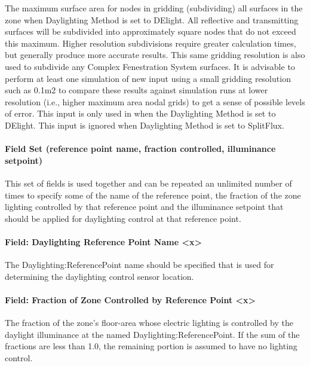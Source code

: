 The maximum surface area for nodes in gridding (subdividing) all surfaces in the zone when Daylighting Method is set to DElight. All reflective and transmitting surfaces will be subdivided into approximately square nodes that do not exceed this maximum. Higher resolution subdivisions require greater calculation times, but generally produce more accurate results. This same gridding resolution is also used to subdivide any Complex Fenestration System surfaces. It is advisable to perform at least one simulation of new input using a small gridding resolution such as 0.1m2 to compare these results against simulation runs at lower resolution (i.e., higher maximum area nodal grids) to get a sense of possible levels of error. This input is only used in when the Daylighting Method is set to DElight. This input is ignored when Daylighting Method is set to SplitFlux.

\paragraph{Field Set (reference point name, fraction controlled, illuminance setpoint)}\label{field-set-daylightingcontrols}

This set of fields is used together and can be repeated an unlimited number of times to specify some of the name of the reference point, the fraction of the zone lighting controlled by that reference point and the illuminance setpoint that should be applied for daylighting control at that reference point.

\paragraph{Field: Daylighting Reference Point Name <x>}\label{field-daylighting-reference-point-name-x}

The Daylighting:ReferencePoint name should be specified that is used for determining the daylighting control sensor location.

\paragraph{Field: Fraction of Zone Controlled by Reference Point <x>}\label{field-fraction-of-zone-controlled-by-reference-point-x}

The fraction of the zone's floor-area whose electric lighting is controlled by the daylight illuminance at the named Daylighting:ReferencePoint. If the sum of the fractions are less than 1.0, the remaining portion is assumed to have no lighting control.

